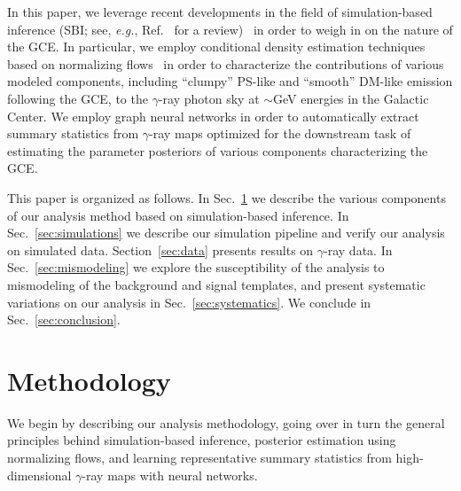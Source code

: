 \documentclass[prd,aps,10pt,nofootinbib,twocolumn,superscriptaddress,preprintnumbers,balancelastpage,longbibliography]{revtex4-1}
\begin{document}
 In this paper, we leverage recent developments in the field of simulation-based inference (SBI; see, \emph{e.g.}, Ref.~\cite{cranmer2020frontier} for a review)~\cite{Alsing:2019xrx,Brehmer:2018eca,Brehmer:2018hga,Brehmer:2018kdj,Brehmer:2020cvb,Cranmer:2015bka,cranmerFrontierSimulationbasedInference2020,durkanContrastiveLearningLikelihoodfree2020,greenbergAutomaticPosteriorTransformation2019,Hermans:2019ioj,lueckmannBenchmarkingSimulationBasedInference2021,lueckmannLikelihoodfreeInferenceEmulator2019,pacchiardiGeneralizedBayesianLikelihoodFree2021,papamakariosFastEpsilonFree2018,papamakariosSequentialNeuralLikelihood2019,wiqvistSequentialNeuralPosterior2021,zhaoValidatingConditionalDensity2021} in order to weigh in on the nature of the GCE. In particular, we employ conditional density estimation techniques based on normalizing flows~\cite{papamakarios2019normalizing,rezende2015variational} in order to characterize the contributions of various modeled components, including ``clumpy'' PS-like and ``smooth'' DM-like emission following the GCE, to the $\gamma$-ray photon sky at $\sim$GeV energies in the Galactic Center. We employ graph neural networks in order to automatically extract summary statistics from $\gamma$-ray maps optimized for the downstream task of estimating the parameter posteriors of various components characterizing the GCE.

This paper is organized as follows. In Sec.~\ref{sec:analysis} we describe the various components of our analysis method based on simulation-based inference. In Sec.~\ref{sec:simulations} we describe our simulation pipeline and verify our analysis on simulated data. Section~\ref{sec:data} presents results on \Fermi $\gamma$-ray data. In Sec.~\ref{sec:mismodeling} we explore the susceptibility of the analysis to mismodeling of the background and signal templates, and present systematic variations on our analysis in Sec.~\ref{sec:systematics}. We conclude in Sec.~\ref{sec:conclusion}.

\section{Methodology}
\label{sec:analysis}

We begin by describing our analysis methodology, going over in turn the general principles behind simulation-based inference, posterior estimation using normalizing flows, and learning representative summary statistics from high-dimensional $\gamma$-ray maps with neural networks.
\end{document}
